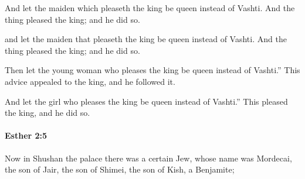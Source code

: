 			And let the maiden which pleaseth the king be queen instead of Vashti. And the thing pleased the king; and he did so.

			\begin{versebox}
					\item[BHS] 
					\item[LXX] 
					\item[ASV] and let the maiden that pleaseth the king be queen instead of Vashti. And the thing pleased the king; and he did so.
					\item[NIV] Then let the young woman who pleases the king be queen instead of Vashti.” This advice appealed to the king, and he followed it.
					\item[NRSV] And let the girl who pleases the king be queen instead of Vashti.” This pleased the king, and he did so.
			\end{versebox}

		\paragraph{Esther 2:5} %
			\label{ESTHER-2-5}

			Now in Shushan the palace there was a certain Jew, whose name was Mordecai, the son of Jair, the son of Shimei, the son of Kish, a Benjamite;

